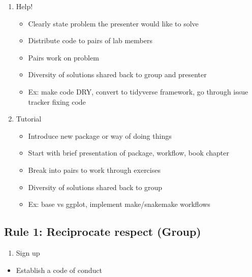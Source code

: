\documentclass[
  11pt,
]{article}
\providecommand{\tightlist}{%
  \setlength{\itemsep}{0pt}\setlength{\parskip}{0pt}}
\begin{document}
\begin{enumerate}
\def\labelenumi{\arabic{enumi}.}
\tightlist
\item
  Help!

  \begin{itemize}
  \tightlist
  \item
    Clearly state problem the presenter would like to solve
  \item
    Distribute code to pairs of lab members
  \item
    Pairs work on problem
  \item
    Diversity of solutions shared back to group and presenter
  \item
    Ex: make code DRY, convert to tidyverse framework, go through issue
    tracker fixing code
  \end{itemize}
\item
  Tutorial

  \begin{itemize}
  \tightlist
  \item
    Introduce new package or way of doing things
  \item
    Start with brief presentation of package, workflow, book chapter
  \item
    Break into pairs to work through exercises
  \item
    Diversity of solutions shared back to group
  \item
    Ex: base vs ggplot, implement make/snakemake workflows
  \end{itemize}
\end{enumerate}

\hypertarget{rule-1-reciprocate-respect-group}{%
\subsection{Rule 1: Reciprocate respect
(Group)}\label{rule-1-reciprocate-respect-group}}

\begin{enumerate}
\def\labelenumi{\arabic{enumi}.}
\tightlist
\item
  Sign up
\end{enumerate}

\begin{itemize}
\tightlist
\item
  Establish a code of conduct
\end{itemize}
\end{document}

